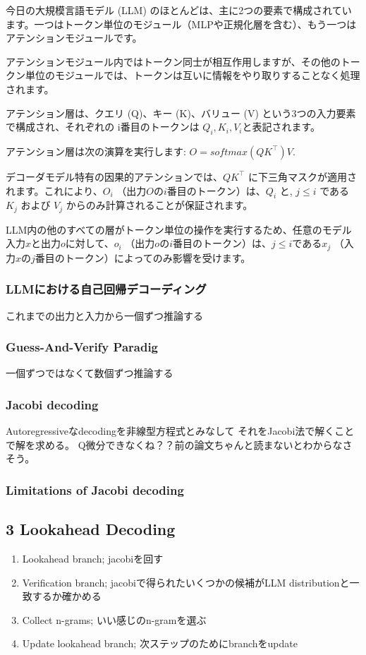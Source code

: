 \documentclass[uplatex]{jsarticle}
\theoremstyle{remark}
\begin{document}
今日の大規模言語モデル (LLM) のほとんどは、主に2つの要素で構成されています。一つはトークン単位のモジュール（MLPや正規化層を含む）、もう一つはアテンションモジュールです。

アテンションモジュール内ではトークン同士が相互作用しますが、その他のトークン単位のモジュールでは、トークンは互いに情報をやり取りすることなく処理されます。

アテンション層は、クエリ (Q)、キー (K)、バリュー (V) という3つの入力要素で構成され、それぞれの i番目のトークンは
$Q_i, K_i, V_i$と表記されます。

アテンション層は次の演算を実行します: $O = softmax(QK^\top)V$.

デコーダモデル特有の因果的アテンションでは、$QK^\top$
  に下三角マスクが適用されます。これにより、$O_i$
  （出力$O$の$i$番目のトークン）は、$Q_i$
  と, $j \leq i$ である $K_j$
  および $V_j$
  からのみ計算されることが保証されます。

LLM内の他のすべての層がトークン単位の操作を実行するため、任意のモデル入力$x$と出力$o$に対して、$o_i$
  （出力$o$の$i$番目のトークン）は、$j\leq i$である$x_j$
  （入力$x$の$j$番目のトークン）によってのみ影響を受けます。

\subsubsection{LLMにおける自己回帰デコーディング}
これまでの出力と入力から一個ずつ推論する

\subsubsection{Guess-And-Verify Paradig}
一個ずつではなくて数個ずつ推論する

\subsubsection{Jacobi decoding}
Autoregressiveなdecodingを非線型方程式とみなして
それをJacobi法で解くことで解を求める。
Q微分できなくね？？前の論文ちゃんと読まないとわからなさそう。

\subsubsection{Limitations of Jacobi decoding}

\subsection{3 Lookahead Decoding}
\begin{enumerate}
    \item Lookahead branch; jacobiを回す
    \item Verification branch; jacobiで得られたいくつかの候補がLLM distributionと一致するか確かめる
    \item Collect n-grams; いい感じのn-gramを選ぶ
    \item Update lookahead branch; 次ステップのためにbranchをupdate
\end{enumerate}



\end{document}
